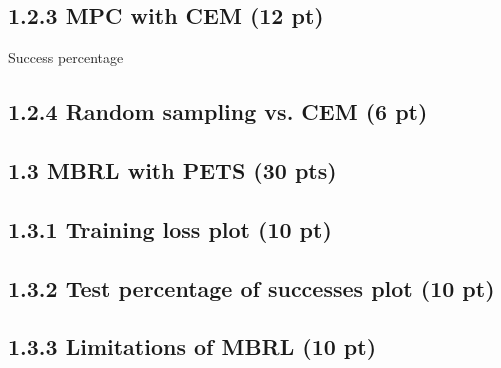 \documentclass[12pt]{article}
\begin{document}
\subsection*{1.2.3 MPC with CEM (12 pt)}

Success percentage
\begin{tcolorbox}[fit,height=1cm, width=5cm, blank, borderline={1pt}{1pt},nobeforeafter]
\begin{center}
\end{center}
\end{tcolorbox}

\subsection*{1.2.4 Random sampling vs. CEM  (6 pt)}

\begin{tcolorbox}[fit,height=20em, width=40em, blank, borderline={1pt}{1pt},nobeforeafter]
\begin{center}
\end{center}
\end{tcolorbox}


\subsection*{1.3 MBRL with PETS (30 pts)}

\subsection*{1.3.1 Training loss plot (10 pt)}

\begin{tcolorbox}[fit,height=30em, width=40em, blank, borderline={1pt}{1pt},nobeforeafter]
\begin{center}
\end{center}
\end{tcolorbox}

\subsection*{1.3.2 Test percentage of successes plot (10 pt)}

\begin{tcolorbox}[fit,height=30em, width=40em, blank, borderline={1pt}{1pt},nobeforeafter]
\begin{center}
\end{center}
\end{tcolorbox}

\subsection*{1.3.3 Limitations of MBRL (10 pt)}

\begin{tcolorbox}[fit,height=20em, width=40em, blank, borderline={1pt}{1pt},nobeforeafter]
\begin{center}
\end{center}
\end{tcolorbox}
\end{document}
